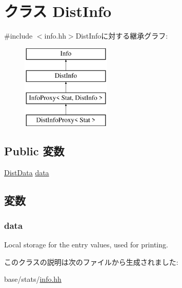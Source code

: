 \hypertarget{classStats_1_1DistInfo}{
\section{クラス DistInfo}
\label{classStats_1_1DistInfo}
}


{\ttfamily \#include $<$info.hh$>$}DistInfoに対する継承グラフ:\begin{figure}[H]
\begin{center}
\leavevmode
\includegraphics[height=4cm]{classStats_1_1DistInfo}
\end{center}
\end{figure}
\subsection*{Public 変数}
\begin{DoxyCompactItemize}
\item 
\hyperlink{structStats_1_1DistData}{DistData} \hyperlink{classStats_1_1DistInfo_a61795741e5e1e55540c807e901085878}{data}
\end{DoxyCompactItemize}


\subsection{変数}
\hypertarget{classStats_1_1DistInfo_a61795741e5e1e55540c807e901085878}{
\subsubsection[{data}]{ {\bf data}}}
\label{classStats_1_1DistInfo_a61795741e5e1e55540c807e901085878}
Local storage for the entry values, used for printing. 

このクラスの説明は次のファイルから生成されました:\begin{DoxyCompactItemize}
\item 
base/stats/\hyperlink{info_8hh}{info.hh}\end{DoxyCompactItemize}
